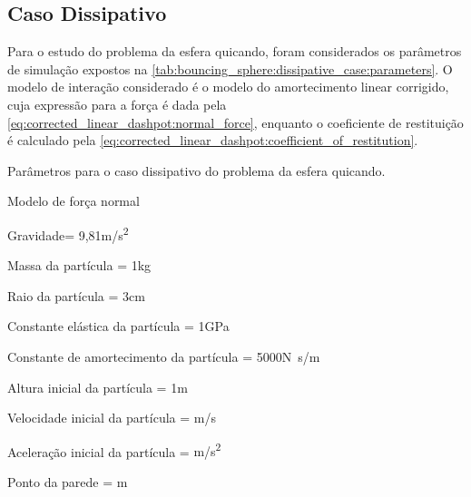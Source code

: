 \subsection{Caso Dissipativo} \label{sec:results:bouncing_sphere:dissipative_case}

Para o estudo do problema da esfera quicando, foram considerados os parâmetros de simulação expostos na \cref{tab:bouncing_sphere:dissipative_case:parameters}. O modelo de interação considerado é o modelo do amortecimento linear corrigido, cuja expressão para a força é dada pela \cref{eq:corrected_linear_dashpot:normal_force}, enquanto o coeficiente de restituição é calculado pela \cref{eq:corrected_linear_dashpot:coefficient_of_restitution}.

\begin{table}[h]
\centering
\caption{Parâmetros para o caso dissipativo do problema da esfera quicando.}
\label{tab:bouncing_sphere:dissipative_case:parameters}
\begin{parametersdesc}{\textwidth}
	\item{Modelo de força normal}{}{\emptyUnit}
	\item{Gravidade}{\gravityScalar = 9,81}{\si[per-mode=symbol]{\metre\per\square\second}}
	\hline
	\item{Massa da partícula}{\ind{\mass}{\particle} = 1}{\si\kilogram}
	\item{Raio da partícula}{\ind{\radius}{\particle} = 3}{\si\centi\metre}
	\item{Constante elástica da partícula}{\ind{\elasticModulus}{\particle} = 1}{\si[per-mode=symbol]{\giga\pascal}}
	\item{Constante de amortecimento da partícula}{\ind{\normalDampingConstant}{\particle} = \SI{5000}{}}{\si[per-mode=symbol]{\newton\second\per\meter}}
	\hline
	\item{Altura inicial da partícula}{\initial{\positiony} = 1}{\si{\metre}}
	\item{Velocidade inicial da partícula}{\explicitVector{\initial{\velocityx}}{\initial{\velocityy}}{\initial{\velocityz}} = }{\si[per-mode=symbol]{\metre\per\second}}
	\item{Aceleração inicial da partícula}{\explicitVector{\initial{\accelerationx}}{\initial{\accelerationy}}{\initial{\accelerationz}} = }{\si[per-mode=symbol]{\metre\per\square\second}}
	\hline
	\item{Ponto da parede}{\ind{\planeOrigin}{\element} = }{\si\meter}

\end{parametersdesc}
\end{table}
